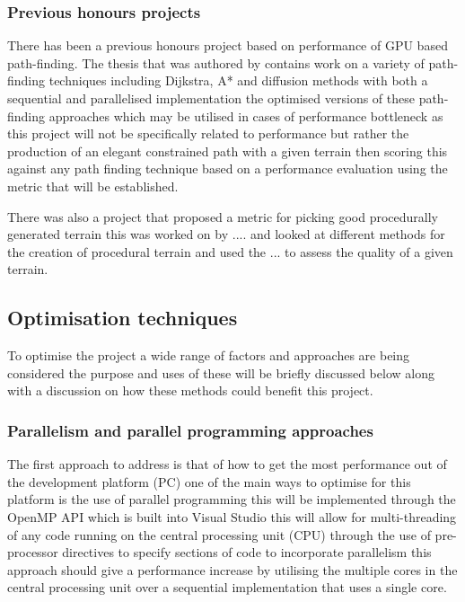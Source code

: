 \subsubsection{Previous honours projects}
There has been a previous honours project based on performance of GPU based path-finding. The thesis that was authored by \cite{honours} contains work on a variety of path-finding techniques including Dijkstra, A* and diffusion methods with both a sequential and parallelised implementation the optimised versions of these path-finding approaches which may be utilised in cases of performance bottleneck as this project will not be specifically related to performance but rather the production of an elegant constrained path with a given terrain then scoring this against any path finding technique based on a performance evaluation using the metric that will be established.


There was also a project that proposed a metric for picking good procedurally generated terrain this was worked on by .... and looked at different methods for the creation of procedural terrain and used the ... to assess the quality of a given terrain.

\subsection{Optimisation techniques}
To optimise the project a wide range of factors and approaches are being considered the purpose and uses of these will be briefly discussed below along with a discussion on how these methods could benefit this project.\\

\subsubsection{Parallelism and parallel programming approaches}
The first approach to address is that of how to get the most performance out of the development platform (PC) one of the main ways to optimise for this platform is the use of parallel programming this will be implemented through the OpenMP API \cite{Openmp}which is built into Visual Studio this will allow for multi-threading of any code running on the central processing unit (CPU) through the use of pre-processor directives to specify sections of code to incorporate parallelism this approach should give a performance increase by utilising the multiple cores in the central processing unit over a sequential implementation that uses a single core.

